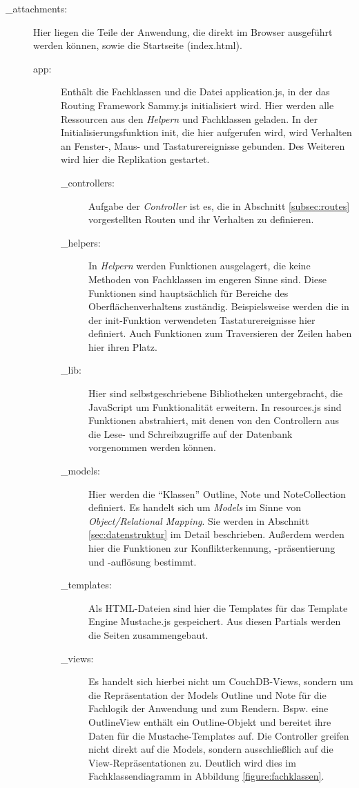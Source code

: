 \begin{description}
  \item[\_attachments:] Hier liegen die Teile der Anwendung, die direkt im Browser ausgeführt werden können, sowie die Startseite ({\selectfont index.html}).
    \begin{description}
      \item[app:] Enthält die Fachklassen und die Datei {\selectfont application.js}, in der das Routing Framework Sammy.js initialisiert wird. Hier werden alle Ressourcen aus den \textit{Helpern} und Fachklassen geladen. In der Initialisierungsfunktion {\selectfont init}, die hier aufgerufen wird, wird Verhalten an Fenster-, Maus- und Tastaturereignisse gebunden. Des Weiteren wird hier die Replikation gestartet.
        \begin{description}
          \item[\_controllers:] Aufgabe der \textit{Controller} ist es, die in Abschnitt \ref{subsec:routes} vorgestellten Routen und ihr Verhalten zu definieren.
          \item[\_helpers:] In \textit{Helpern} werden Funktionen ausgelagert, die keine Methoden von Fachklassen im engeren Sinne sind. Diese Funktionen sind hauptsächlich für Bereiche des Oberflächenverhaltens zuständig. Beispielsweise werden die in der {\selectfont init}-Funktion verwendeten Tastaturereignisse hier definiert. Auch Funktionen zum Traversieren der Zeilen haben hier ihren Platz.
          \item[\_lib:] Hier sind selbstgeschriebene Bibliotheken untergebracht, die JavaScript um Funktionalität erweitern. In {\selectfont resources.js} sind Funktionen abstrahiert, mit denen von den Controllern aus die Lese- und Schreibzugriffe auf der Datenbank vorgenommen werden können. 
          \item[\_models:] Hier werden die \enquote{Klassen} {\selectfont Outline}, {\selectfont Note} und {\selectfont NoteCollection} definiert. Es handelt sich um \textit{Models} im Sinne von \textit{Object/Relational Mapping}. Sie werden in Abschnitt \ref{sec:datenstruktur} im Detail beschrieben. Außerdem werden hier die Funktionen zur Konflikterkennung, -präsentierung und -auflösung bestimmt.
          \item[\_templates:] Als HTML-Dateien sind hier die Templates für das Template Engine Mustache.js gespeichert. Aus diesen Partials werden die Seiten zusammengebaut.
          \item[\_views:] Es handelt sich hierbei nicht um CouchDB-Views, sondern um die Repräsentation der Models {\selectfont Outline} und {\selectfont Note} für die Fachlogik der Anwendung und zum Rendern. Bspw. eine {\selectfont OutlineView} enthält ein {\selectfont Outline}-Objekt und bereitet ihre Daten für die Mustache-Templates auf. Die Controller greifen nicht direkt auf die Models, sondern ausschließlich auf die View-Repräsentationen zu. Deutlich wird dies im Fachklassendiagramm in Abbildung \ref{figure:fachklassen}.
        \end{description}
        

\end{description}
\end{description}
